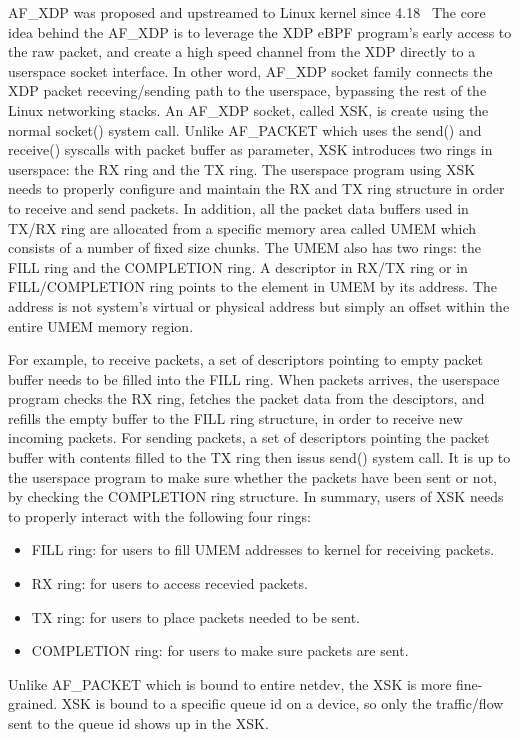 \documentclass[10pt]{sigplanconf}
\begin{document}
AF\_XDP was proposed and upstreamed to Linux kernel since 4.18~\cite{af_xdp_lwn} 
The core idea behind the AF\_XDP is to leverage the XDP eBPF program's
early access to the raw packet, and create a high speed channel from the XDP directly to
a userspace socket interface. In other word, AF\_XDP socket family connects the
XDP packet receving/sending path to the userspace, bypassing the rest of the
Linux networking stacks.
An AF\_XDP socket, called XSK, is create using the normal socket() system
call. Unlike AF\_PACKET which uses the send() and receive() syscalls with packet buffer as parameter,
XSK introduces two rings in userspace: the RX ring and the TX ring.
The userspace program using XSK needs to properly configure and maintain
the RX and TX ring structure in order to receive and send packets.
In addition, all the packet data buffers used in TX/RX ring are allocated from a specific
memory area called UMEM which consists of a number of fixed size chunks.
The UMEM also has two rings: the FILL ring and the COMPLETION ring.
A descriptor in RX/TX ring or in FILL/COMPLETION ring points to the element
in UMEM by its address.  The address is not system's virtual or physical address
but simply an offset within the entire UMEM memory region.

For example, to receive packets, a set of descriptors pointing to empty
packet buffer needs to be filled into the FILL ring.  When packets arrives,
the userspace program checks the RX ring, fetches the packet data from the
desciptors, and refills the empty buffer to the FILL ring structure, in order to receive new
incoming packets.  For sending packets, a set of descriptors pointing the
packet buffer with contents filled to the TX ring then issus send() system call.
It is up to the userspace program to make sure whether the packets have been
sent or not, by checking the COMPLETION ring structure.
In summary, users of XSK needs to properly interact with the following four
rings:
\begin{itemize}
\item FILL ring: for users to fill UMEM addresses to kernel for receiving packets.
\item RX ring: for users to access recevied packets. 
\item TX ring: for users to place packets needed to be sent.
\item COMPLETION ring: for users to make sure packets are sent.
\end{itemize}
Unlike AF\_PACKET which is bound to entire netdev, the XSK is more fine-grained.
XSK is bound to a specific queue id on a device, so only the traffic/flow 
sent to the queue id shows up in the XSK.
\end{document}
